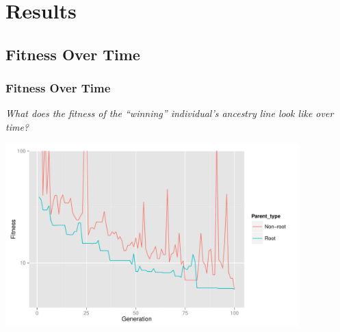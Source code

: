 \documentclass{beamer}
\begin{document}
\section[Results]{Results}



\subsection[Fitness Graph]{Fitness Over Time}

\begin{frame}
\frametitle{Fitness Over Time}
\emph{What does the fitness of the ``winning'' individual's ancestry line look like over time?}
\begin{center}
\includegraphics[width=0.85\textwidth]{Combined_fitness_over_time_no_dashed}
\end{center}
\end{frame}
\end{document}
